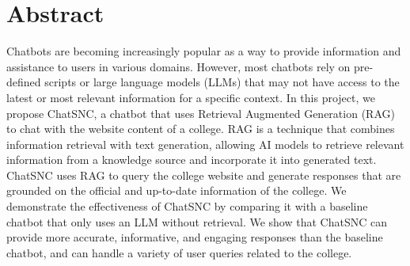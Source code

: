 \chapter*{Abstract}%
%

Chatbots are becoming increasingly popular as a way
to provide information and assistance to users in various
domains. However, most chatbots rely on pre-defined scripts or large language models (LLMs) that may not have access to the latest or most relevant information for a specific context. In this project, we propose ChatSNC, a chatbot that uses Retrieval Augmented Generation (RAG) to chat with the website content of a college. RAG is a technique that combines information retrieval with text generation, allowing AI models to retrieve relevant information from a knowledge source and incorporate it into generated text. ChatSNC uses RAG to query the college website and generate responses that are grounded on the official and up-to-date information of the college. We demonstrate the effectiveness of ChatSNC by comparing it with a baseline chatbot that only uses an LLM without retrieval. We show that ChatSNC can provide more accurate, informative, and engaging responses than the baseline chatbot, and can handle a variety of user queries related to the college.


\thispagestyle{plain}
